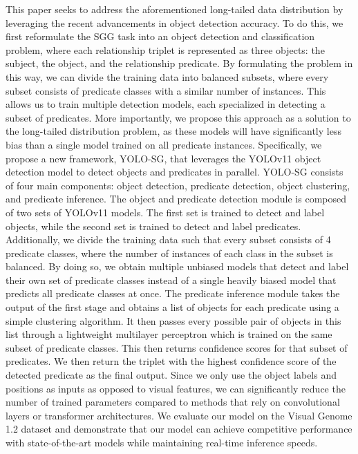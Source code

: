 \documentclass{article}
\begin{document}
This paper seeks to address the aforementioned long-tailed data distribution by leveraging the recent advancements in object detection accuracy. To do this, we first reformulate the SGG task into an object detection and classification problem, where each relationship triplet is represented as three objects: the subject, the object, and the relationship predicate.
By formulating the problem in this way, we can divide the training data into balanced subsets, where every subset consists of predicate classes with a similar number of instances. This allows us to train multiple detection models, each specialized in detecting a subset of predicates. More importantly, we propose this approach as a solution to the long-tailed distribution problem, as these models will have significantly less bias than a single model trained on all predicate instances.
Specifically, we propose a new framework, YOLO-SG, that leverages the YOLOv11 object detection model\cite{redmon2016you} to detect objects and predicates in parallel. YOLO-SG consists of four main components: object detection, predicate detection, object clustering, and predicate inference. The object and predicate detection module is composed of two sets of YOLOv11 models\cite{redmon2016you}. 
The first set is trained to detect and label objects, while the second set is trained to detect and label predicates. Additionally, we divide the training data such that every subset consists of 4 predicate classes, where the number of instances of each class in the subset is balanced. By doing so, we obtain multiple unbiased models that detect and label their own set of predicate classes instead of a single heavily biased model that predicts all predicate classes at once.
The predicate inference module takes the output of the first stage and obtains a list of objects for each predicate using a simple clustering algorithm.
It then passes every possible pair of objects in this list through a lightweight multilayer perceptron which is trained on the same subset of predicate classes. This then returns confidence scores for that subset of predicates. We then return the triplet with the highest confidence score of the detected predicate as the final output. Since we only use the object labels and positions as inputs as opposed to visual features, we can significantly reduce the number of trained parameters compared to methods that rely on convolutional layers or transformer architectures. We evaluate our model on the Visual Genome 1.2 dataset\cite{krishna2017visual} and demonstrate that our model can achieve competitive performance with state-of-the-art models while maintaining real-time inference speeds.
\end{document}
